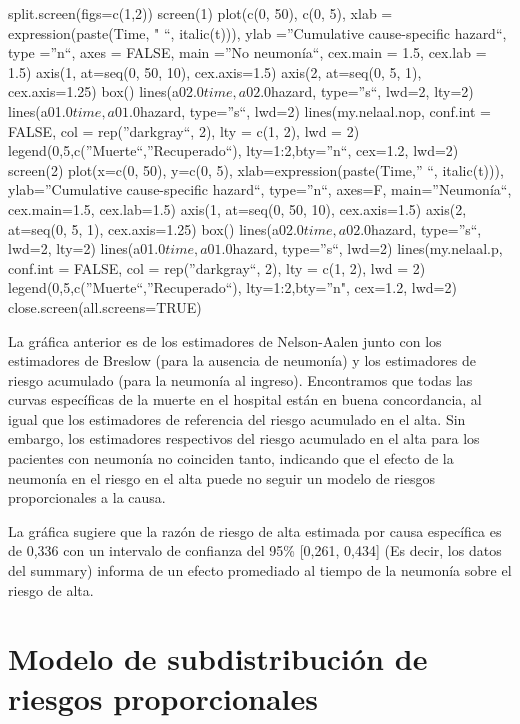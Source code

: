 \documentclass[
]{article}
\begin{document}
split.screen(figs=c(1,2)) screen(1) plot(c(0, 50), c(0, 5), xlab =
expression(paste(Time, " ``, italic(t))), ylab =''Cumulative
cause-specific hazard``, type =''n``, axes = FALSE, main =''No
neumonía``, cex.main = 1.5, cex.lab = 1.5) axis(1, at=seq(0, 50, 10),
cex.axis=1.5) axis(2, at=seq(0, 5, 1), cex.axis=1.25) box()
lines(a02.0\(time, a02.0\)hazard, type=''s``, lwd=2, lty=2)
lines(a01.0\(time, a01.0\)hazard, type=''s``, lwd=2)
lines(my.nelaal.nop, conf.int = FALSE, col = rep(''darkgray``, 2), lty =
c(1, 2), lwd = 2) legend(0,5,c(''Muerte``,''Recuperado``),
lty=1:2,bty=''n``, cex=1.2, lwd=2) screen(2) plot(x=c(0, 50), y=c(0, 5),
xlab=expression(paste(Time,'' ``, italic(t))), ylab=''Cumulative
cause-specific hazard``, type=''n``, axes=F, main=''Neumonía``,
cex.main=1.5, cex.lab=1.5) axis(1, at=seq(0, 50, 10), cex.axis=1.5)
axis(2, at=seq(0, 5, 1), cex.axis=1.25) box()
lines(a02.0\(time, a02.0\)hazard, type=''s``, lwd=2, lty=2)
lines(a01.0\(time, a01.0\)hazard, type=''s``, lwd=2) lines(my.nelaal.p,
conf.int = FALSE, col = rep(''darkgray``, 2), lty = c(1, 2), lwd = 2)
legend(0,5,c(''Muerte``,''Recuperado``), lty=1:2,bty=''n", cex=1.2,
lwd=2) close.screen(all.screens=TRUE)

La gráfica anterior es de los estimadores de Nelson-Aalen junto con los
estimadores de Breslow (para la ausencia de neumonía) y los estimadores
de riesgo acumulado (para la neumonía al ingreso). Encontramos que todas
las curvas específicas de la muerte en el hospital están en buena
concordancia, al igual que los estimadores de referencia del riesgo
acumulado en el alta. Sin embargo, los estimadores respectivos del
riesgo acumulado en el alta para los pacientes con neumonía no coinciden
tanto, indicando que el efecto de la neumonía en el riesgo en el alta
puede no seguir un modelo de riesgos proporcionales a la causa.

La gráfica sugiere que la razón de riesgo de alta estimada por causa
específica es de 0,336 con un intervalo de confianza del 95\% {[}0,261,
0,434{]} (Es decir, los datos del summary) informa de un efecto
promediado al tiempo de la neumonía sobre el riesgo de alta.

\hypertarget{modelo-de-subdistribuciuxf3n-de-riesgos-proporcionales}{%
\section{Modelo de subdistribución de riesgos
proporcionales}\label{modelo-de-subdistribuciuxf3n-de-riesgos-proporcionales}}
\end{document}
